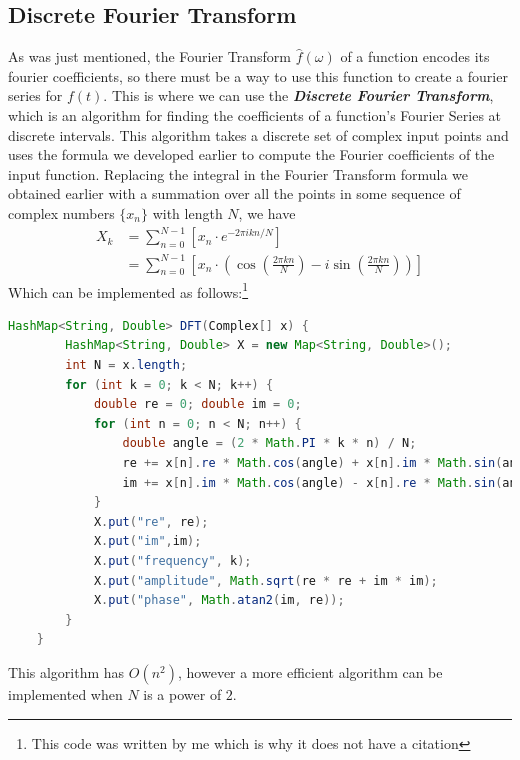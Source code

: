 \documentclass[12pt]{article}
\begin{document}
    \subsection{Discrete Fourier Transform}
    As was just mentioned, the Fourier Transform $\hat{f}(\omega)$ of a function encodes its fourier coefficients, so there must be a way to use this function to create a fourier series for $f(t)$. This is where we can use the \textbf{\emph{Discrete Fourier Transform}}, which is an algorithm for finding the coefficients of a function's Fourier Series at discrete intervals. This algorithm takes a discrete set of complex input points and uses the formula we developed earlier to compute the Fourier coefficients of the input function. Replacing the integral in the Fourier Transform formula we obtained earlier with a summation over all the points in some sequence of complex numbers $\{x_n\}$ with length $N$, we have
    \begin{align}
        X_k &= \sum_{n=0}^{N-1}\left[ x_n \cdot e^{-2\pi i k n / N} \right] \\
            &= \sum_{n=0}^{N-1}\left[ x_n \cdot \left( \cos\left( \frac{2\pi k n}{N} \right) - i\sin\left( \frac{2 \pi k n}{N} \right)  \right) \right]
    \end{align}
    Which can be implemented as follows:\footnote{This code was written by me which is why it does not have a citation}
    \begin{lstlisting}[language=Java, basicstyle=\small]
    HashMap<String, Double> DFT(Complex[] x) {
        HashMap<String, Double> X = new Map<String, Double>();
        int N = x.length;
        for (int k = 0; k < N; k++) {
            double re = 0; double im = 0;
            for (int n = 0; n < N; n++) {
                double angle = (2 * Math.PI * k * n) / N;
                re += x[n].re * Math.cos(angle) + x[n].im * Math.sin(angle);
                im += x[n].im * Math.cos(angle) - x[n].re * Math.sin(angle);
            }
            X.put("re", re);
            X.put("im",im);
            X.put("frequency", k);
            X.put("amplitude", Math.sqrt(re * re + im * im);
            X.put("phase", Math.atan2(im, re));
        }
    }
    \end{lstlisting}
    This algorithm has $O(n^2)$, however a more efficient algorithm can be implemented when $N$ is a power of  $2$.
\end{document}
